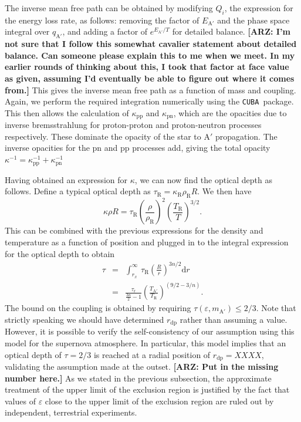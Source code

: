 \documentclass[nofootinbib,prd,superscriptaddress,twocolumn]{revtex4}
\newcommand{\beq}{\begin{equation}}
\newcommand{\eeq}{\end{equation}}
\newcommand{\bea}{\begin{eqnarray}}
\newcommand{\eea}{\end{eqnarray}}
\newcommand{\qa}{q_{\mathrm{A}'}}
\newcommand{\dd}{\mathrm{d}}
\newcommand{\arz}[1]{{{\bf{\color{BrickRed}[ARZ: #1]}}}}
\begin{document}
The inverse mean free path can be obtained by modifying $ Q_i $, 
the expression for the energy loss rate, as follows: removing the factor of $ E_\mathrm{A'} $ 
and the phase space integral over $ \qa $, and adding a factor of $ e^{E_\mathrm{A'}/T} $ for detailed balance. 
\arz{I'm not sure that I follow this somewhat cavalier statement about detailed balance. Can someone 
please explain this to me when we meet. In my earlier rounds of thinking about this, I took that factor 
at face value as given, assuming I'd eventually be able to figure out where it comes from.} 
This gives the inverse mean free path as a function of mass and coupling. 
Again, we perform the required integration numerically using the {\tt CUBA }package. 
This then allows the calculation of $\kappa_{\mathrm{pp}}$ and $\kappa_{\mathrm{pn}}$, 
which are the opacities due to inverse bremsstrahlung for proton-proton and proton-neutron 
processes respectively. These dominate the opacity of the star to $\mathrm{A'}$ propagation. 
The inverse opacities for the $\mathrm{pn}$ and $\mathrm{pp}$ processes add, 
giving the total opacity $ \kappa^{-1} = \kappa_{\mathrm{pp}}^{-1} + \kappa_{\mathrm{pn}}^{-1} $


Having obtained an expression for $ \kappa $, we can now find the optical depth as follows. 
Define a typical optical depth as $\tau_\mathrm{R} = \kappa_\mathrm{R} \rho_\mathrm{R} R $. We then have 
\beq 
\kappa \rho R = \tau_\mathrm{R} \left( \frac{\rho}{\rho_\mathrm{R}} \right)^2 \left( \frac{T_\mathrm{R}}{T} \right)^{3/2}.
\eeq
%
This can be combined with the previous expressions for the density and temperature as a function of position 
and plugged in to the integral expression for the optical depth to obtain 
\bea 
\tau &=& \int_{r_x}^{\infty}\, \tau_\mathrm{R} \left( \frac{R}{r} \right)^{3n/2} \dd r \\
 &=& \frac{\tau_\mathrm{r}}{\frac{3n}{2}-1} \left( \frac{T_\mathrm{A'}}{T_\mathrm{R}} \right)^{(9/2-3/n)}. 
 \eea
 The bound on the coupling is obtained by requiring  $ \tau(\varepsilon,m_\mathrm{A'}) \le 2/3 $. Note that strictly speaking we should have determined $ r_{\mathrm{dp}}$ rather than assuming a value. However, it is possible to verify the self-consistency of our assumption using this model for the supernova atmosphere. In particular, this model implies that an optical depth of $\tau=2/3$ is reached at a radial position of $ r_{\mathrm{dp}}=XXXX$,  validating the assumption made at the outset. \arz{Put in the missing number here.} As we stated in the previous subsection, the approximate treatment of the upper limit of the exclusion region is justified by the fact that values of $\varepsilon$ close to the upper limit of the exclusion region are ruled out by independent, terrestrial experiments.
\end{document}
